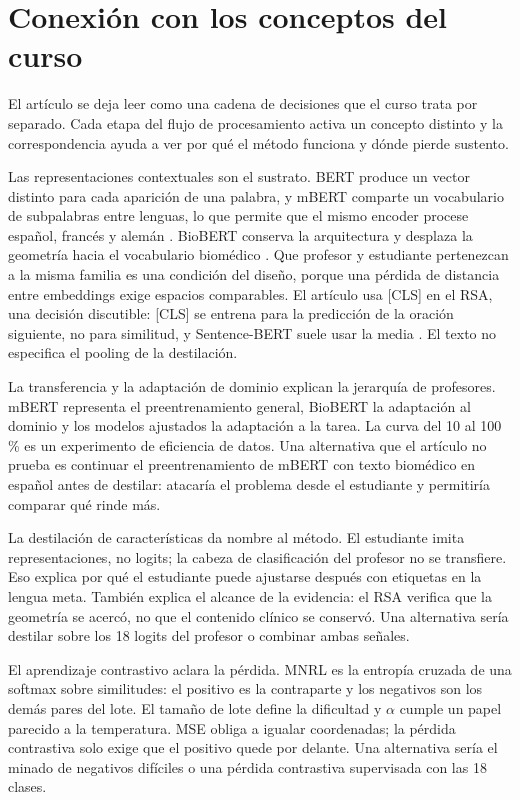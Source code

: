 \section{Conexión con los conceptos del curso}
\label{sec:curso}

El artículo \cite{piperno2025} se deja leer como una cadena de decisiones que el curso trata por separado. Cada etapa del flujo de procesamiento activa un concepto distinto y la correspondencia ayuda a ver por qué el método funciona y dónde pierde sustento.

Las representaciones contextuales son el sustrato. BERT produce un vector distinto para cada aparición de una palabra, y mBERT comparte un vocabulario de subpalabras entre lenguas, lo que permite que el mismo encoder procese español, francés y alemán \cite{devlin2019}. BioBERT conserva la arquitectura y desplaza la geometría hacia el vocabulario biomédico \cite{lee2020}. Que profesor y estudiante pertenezcan a la misma familia es una condición del diseño, porque una pérdida de distancia entre embeddings exige espacios comparables. El artículo usa [CLS] en el RSA, una decisión discutible: [CLS] se entrena para la predicción de la oración siguiente, no para similitud, y Sentence-BERT suele usar la media \cite{reimers2019}. El texto no especifica el pooling de la destilación.

La transferencia y la adaptación de dominio explican la jerarquía de profesores. mBERT representa el preentrenamiento general, BioBERT la adaptación al dominio y los modelos ajustados la adaptación a la tarea. La curva del 10 al 100\,\% es un experimento de eficiencia de datos. Una alternativa que el artículo no prueba es continuar el preentrenamiento de mBERT con texto biomédico en español antes de destilar: atacaría el problema desde el estudiante y permitiría comparar qué rinde más.

La destilación de características da nombre al método. El estudiante imita representaciones, no logits; la cabeza de clasificación del profesor no se transfiere. Eso explica por qué el estudiante puede ajustarse después con etiquetas en la lengua meta. También explica el alcance de la evidencia: el RSA verifica que la geometría se acercó, no que el contenido clínico se conservó. Una alternativa sería destilar sobre los 18 logits del profesor o combinar ambas señales.

El aprendizaje contrastivo aclara la pérdida. MNRL es la entropía cruzada de una softmax sobre similitudes: el positivo es la contraparte y los negativos son los demás pares del lote. El tamaño de lote define la dificultad y $\alpha$ cumple un papel parecido a la temperatura. MSE obliga a igualar coordenadas; la pérdida contrastiva solo exige que el positivo quede por delante. Una alternativa sería el minado de negativos difíciles o una pérdida contrastiva supervisada con las 18 clases.

